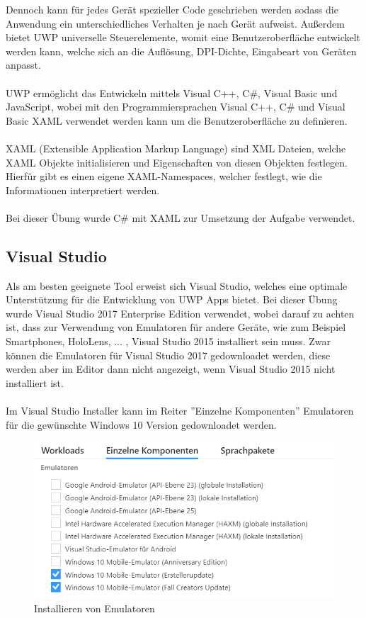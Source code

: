 Dennoch kann für jedes Gerät spezieller Code geschrieben werden sodass die Anwendung ein unterschiedliches Verhalten je nach Gerät aufweist. Außerdem bietet UWP universelle Steuerelemente, womit eine Benutzeroberfläche entwickelt werden kann, welche sich an die Auflösung, DPI-Dichte, Eingabeart von Geräten anpasst.
\\\\
UWP ermöglicht das Entwickeln mittels Visual C++, C\#, Visual Basic und JavaScript, wobei mit den Programmiersprachen Visual C++, C\# und Visual Basic XAML verwendet werden kann um die Benutzeroberfläche zu definieren. \cite{UWPAllgemein}
\\\\
XAML (Extensible Application Markup Language) sind XML Dateien, welche XAML Objekte initialisieren und Eigenschaften von diesen Objekten festlegen. Hierfür gibt es einen eigene XAML-Namespaces, welcher festlegt, wie die Informationen interpretiert werden. \cite{xamlOverview}
\\\\
Bei dieser Übung wurde C\# mit XAML zur Umsetzung der Aufgabe verwendet.

\subsection{Visual Studio}

Als am besten geeignete Tool erweist sich Visual Studio, welches eine optimale Unterstützung für die Entwicklung von UWP Apps bietet. Bei dieser Übung wurde Visual Studio 2017 Enterprise Edition verwendet, wobei darauf zu achten ist, dass zur Verwendung von Emulatoren für andere Geräte, wie zum Beispiel Smartphones, HoloLens, ... , Visual Studio 2015 installiert sein muss. Zwar können die Emulatoren für Visual Studio 2017 gedownloadet werden, diese werden aber im Editor dann nicht angezeigt, wenn Visual Studio 2015 nicht installiert ist.
\\\\
Im Visual Studio Installer kann im Reiter ''Einzelne Komponenten'' Emulatoren für die gewünschte Windows 10 Version gedownloadet werden.

\begin{figure}[H]
	\centering
	\includegraphics[width=0.7\linewidth]{images/screenshot002}
	\caption{Installieren von Emulatoren}
	\label{fig:screenshot002}
\end{figure}

